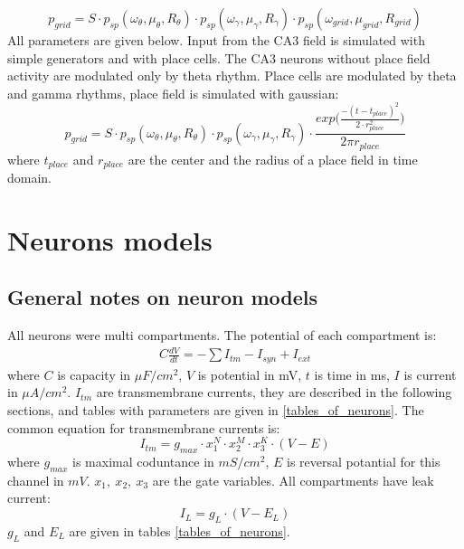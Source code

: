 \documentclass[a4paper,12pt]{article}
\begin{document}
\begin{equation}
p_{grid} = S \cdot p_{sp}(\omega_{\theta}, \mu_{\theta}, R_{\theta}) \cdot  p_{sp}(\omega_{\gamma}, \mu_{\gamma}, R_{\gamma}) \cdot  p_{sp}(\omega_{grid}, \mu_{grid}, R_{grid})
\end{equation}
All parameters are given below.
Input from the CA3 field is simulated with simple generators and with place cells. The CA3 neurons without place field activity are modulated only by theta rhythm. Place cells are modulated by theta and gamma rhythms, place field is simulated with gaussian:  
\begin{equation}
p_{grid} = S \cdot p_{sp}(\omega_{\theta}, \mu_{\theta}, R_{\theta}) \cdot  p_{sp}(\omega_{\gamma}, \mu_{\gamma}, R_{\gamma}) \cdot 
\frac{exp \Big( \frac{-(t - t_{place})^2}{2 \cdot r_{place}^2}  \Big)}{2 \pi r_{place}}  
\end{equation}
where $t_{place}$ and $r_{place}$ are the center and the radius of a place field in time domain.







\section{Neurons models}
\subsection{General notes on neuron models}
All neurons were multi compartments. The potential of each compartment is: 
\begin{eqnarray}
\label{eq:comon_potential}
C\frac{dV}{dt}=-\sum{I_{tm}}-I_{syn} + I_{ext}
\end{eqnarray}
where $C$ is capacity in $\mu F/ cm^2$, $V$ is potential in mV, $t$ is time in ms, $I$ is current in $\mu A/cm^2$. $I_{tm}$ are transmembrane currents, they are described in the following sections, and tables with parameters are given in \ref{tables_of_neurons}. The common equation for transmembrane currents is:
\begin{equation}
I_{tm}= g_{max}\cdot x_1^N\cdot x_2^M \cdot x_3^K \cdot (V-E)
\end{equation}
where $ g_{max}$ is maximal coduntance in $mS/ cm^2$, $E$ is reversal potantial for this channel in $mV$. $x_1,\ x_2, \ x_3$ are the gate variables. All compartments have leak current:
\begin{equation}
I_{L}= g_{L} \cdot (V - E_{L})
\end{equation}
$g_{L}$ and $E_{L}$ are given in tables \ref{tables_of_neurons}.
\end{document}
